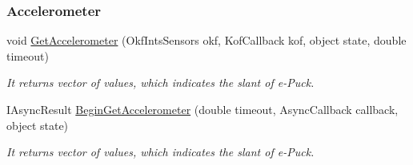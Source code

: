  \subsubsection*{Accelerometer} %
 \label{ssub:Accelerometer}
  \begin{DoxyCompactItemize}

  \item  void \hyperlink{class_elib_1_1_epuck_a87e5d0c07a8d2cc6909dabbc1a79ca1d}{GetAccelerometer} (OkfIntsSensors okf, KofCallback kof, object state, double timeout)
  \begin{DoxyCompactList}\small\item\em It returns vector of values, which indicates the slant of e-\/Puck. \item\end{DoxyCompactList}
  
  \item  IAsyncResult \hyperlink{class_elib_1_1_epuck_a6d09043fbbed47c089ad6f7cffa05e8c}{BeginGetAccelerometer} (double timeout, AsyncCallback callback, object state)
  \begin{DoxyCompactList}\small\item\em It returns vector of values, which indicates the slant of e-\/Puck. \item\end{DoxyCompactList}

  \end{DoxyCompactItemize}

